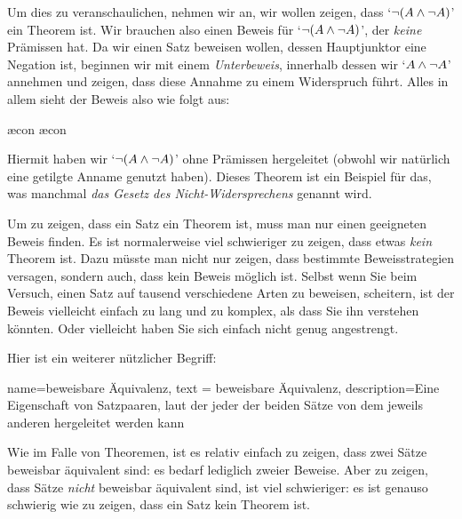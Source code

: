 Um dies zu veranschaulichen, nehmen wir an, wir wollen zeigen, dass `$\neg (A \wedge \neg A)$' ein Theorem ist. Wir brauchen also einen Beweis für `$\neg (A \wedge \neg A)$', der \emph{keine} Prämissen hat. Da wir einen Satz beweisen wollen, dessen Hauptjunktor eine Negation ist, beginnen wir mit einem \emph{Unterbeweis}, innerhalb dessen wir `$A \wedge \neg A$' annehmen und zeigen, dass diese Annahme zu einem Widerspruch führt. Alles in allem sieht der Beweis also wie folgt aus:
	\begin{fitchproof}
		\open
			\ae{con}
			\ae{con}
		\close
	\end{fitchproof}
Hiermit haben wir `$\neg (A \wedge \neg A)$' ohne Prämissen hergeleitet (obwohl wir natürlich eine getilgte Anname genutzt haben). Dieses Theorem ist ein Beispiel für das, was manchmal \emph{das Gesetz des Nicht-Widersprechens} genannt wird.

Um zu zeigen, dass ein Satz ein Theorem ist, muss man nur einen geeigneten Beweis finden. Es ist normalerweise viel schwieriger zu zeigen, dass etwas \emph{kein} Theorem ist. Dazu müsste man nicht nur zeigen, dass bestimmte Beweisstrategien versagen, sondern auch, dass kein Beweis möglich ist. Selbst wenn Sie beim Versuch, einen Satz auf tausend verschiedene Arten zu beweisen, scheitern, ist der Beweis vielleicht einfach zu lang und zu komplex, als dass Sie ihn verstehen könnten. Oder vielleicht haben Sie sich einfach nicht genug angestrengt.

Hier ist ein weiterer nützlicher Begriff:
        
{
  name=beweisbare Äquivalenz,
  text = beweisbare Äquivalenz,
description={Eine Eigenschaft von Satzpaaren, laut der jeder der beiden Sätze von dem jeweils anderen hergeleitet werden kann}
}

Wie im Falle von Theoremen, ist es relativ einfach zu zeigen, dass zwei Sätze beweisbar äquivalent sind: es bedarf lediglich zweier Beweise. Aber zu zeigen, dass Sätze \emph{nicht} beweisbar äquivalent sind, ist viel schwieriger: es ist genauso schwierig wie zu zeigen, dass ein Satz kein Theorem ist. 

